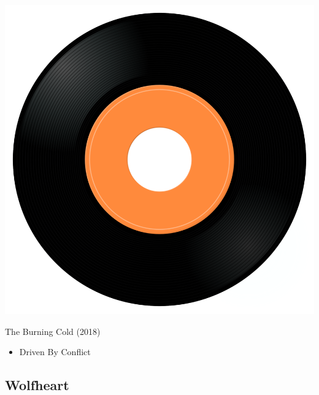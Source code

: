 \begin{minipage}[t]{0.25\textwidth}\vspace{0pt}
\captionsetup{type=figure}
\includegraphics[width=\textwidth]{Images/cover.png}
\caption*{The Burning Cold (2018)}
\end{minipage}
\begin{minipage}[t]{0.25\textwidth}\vspace{0pt}
\begin{itemize}[nosep,leftmargin=1em,labelwidth=*,align=left]
	\setlength{\itemsep}{0pt}
	\item Driven By Conflict
\end{itemize}
\end{minipage}

\subsection{Wolfheart}

